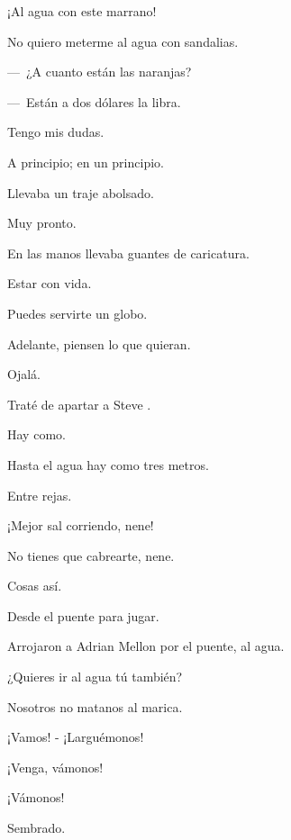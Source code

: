 \sk
¡Al agua con este marrano! 

\sk
No quiero meterme al agua con sandalias. 

\sk
---~¿A cuanto están las naranjas? 

---~Están a dos dólares la libra. 

\sk
Tengo mis dudas. 

\sk
A principio; en un principio. 

\sk
Llevaba un traje abolsado. \nb{}

\sk
Muy pronto. 

\sk
En las manos llevaba guantes de caricatura. 

\sk
Estar con vida. 

\sk
Puedes servirte un globo. 

\sk
Adelante, piensen lo que quieran. 

\sk
Ojalá. 

\sk
Traté de apartar a Steve . 

\sk
Hay como. 

\sk
Hasta el agua hay como tres metros. 

\sk
Entre rejas. 

\sk
¡Mejor sal corriendo, nene! 

\sk
No tienes que cabrearte, nene. 

\sk
Cosas así. 

\sk
Desde el puente para jugar. 

\sk
Arrojaron a Adrian Mellon por el puente, al agua.\nb{}

\sk
¿Quieres ir al agua tú también?\nb{}

\sk
Nosotros no matanos al marica. 

\sk
¡Vamos! - ¡Larguémonos! 

\sk
¡Venga, vámonos! 

\sk
¡Vámonos!

\sk
Sembrado. 


